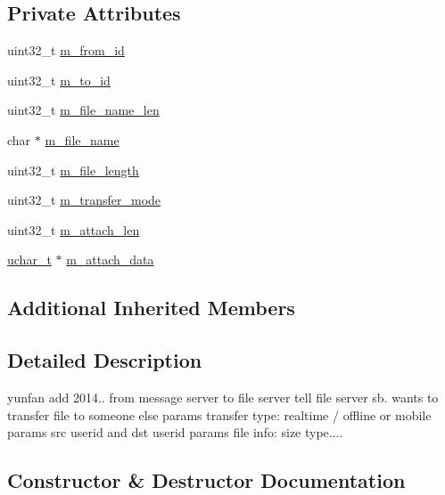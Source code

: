 \subsection*{Private Attributes}
\begin{DoxyCompactItemize}
\item 
uint32\+\_\+t \hyperlink{class_c_im_pdu_msg_file_transfer_req_a84d1ca58f73311b93db9a396f88c2e9b}{m\+\_\+from\+\_\+id}
\item 
uint32\+\_\+t \hyperlink{class_c_im_pdu_msg_file_transfer_req_add6b710155c5c33c5af00b8695fac280}{m\+\_\+to\+\_\+id}
\item 
uint32\+\_\+t \hyperlink{class_c_im_pdu_msg_file_transfer_req_a7bc4c9293a62213fc7ebed9a0569b582}{m\+\_\+file\+\_\+name\+\_\+len}
\item 
char $\ast$ \hyperlink{class_c_im_pdu_msg_file_transfer_req_a63b196b6dce260127f0a2f0f43f2a325}{m\+\_\+file\+\_\+name}
\item 
uint32\+\_\+t \hyperlink{class_c_im_pdu_msg_file_transfer_req_ad664b70b9dfd56603b53f8c6fa050e20}{m\+\_\+file\+\_\+length}
\item 
uint32\+\_\+t \hyperlink{class_c_im_pdu_msg_file_transfer_req_aa81f9a5fce5a6ba298f2fdc0a74a92ca}{m\+\_\+transfer\+\_\+mode}
\item 
uint32\+\_\+t \hyperlink{class_c_im_pdu_msg_file_transfer_req_a8234ef1cd755577bbb4c93b46153693a}{m\+\_\+attach\+\_\+len}
\item 
\hyperlink{base_2ostype_8h_a124ea0f8f4a23a0a286b5582137f0b8d}{uchar\+\_\+t} $\ast$ \hyperlink{class_c_im_pdu_msg_file_transfer_req_aa019016659d42cc613e228213974e019}{m\+\_\+attach\+\_\+data}
\end{DoxyCompactItemize}
\subsection*{Additional Inherited Members}


\subsection{Detailed Description}
yunfan add 2014.. from message server to file server tell file server sb. wants to transfer file to someone else params transfer type\+: realtime / offline or mobile params src userid and dst userid params file info\+: size type.... 

\subsection{Constructor \& Destructor Documentation}
\hypertarget{class_c_im_pdu_msg_file_transfer_req_ab7a090d49ab1ca31dec4e5460ae1c86e}{}
